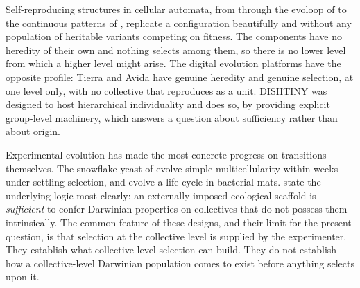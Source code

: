\documentclass{artificial-life}
\begin{document}
Self-reproducing structures in cellular automata, from \citet{langton1984self}
through the evoloop of \citet{sayama1999evoloop} to the continuous patterns of
\citet{chan2020lenia}, replicate a configuration beautifully and without any
population of heritable variants competing on fitness. The components have no
heredity of their own and nothing selects among them, so there is no lower level
from which a higher level might arise. The digital evolution platforms have the
opposite profile: Tierra \citep{ray1991approach} and Avida
\citep{ofria2004avida} have genuine heredity and genuine selection, at one level
only, with no collective that reproduces as a unit. DISHTINY
\citep{moreno2019dishtiny} was designed to host hierarchical individuality and
does so, by providing explicit group-level machinery, which answers a question
about sufficiency rather than about origin.

Experimental evolution has made the most concrete progress on transitions
themselves. The snowflake yeast of \citet{ratcliff2012experimental} evolve
simple multicellularity within weeks under settling selection, and
\citet{hammerschmidt2014life} evolve a life cycle in bacterial mats.
\citet{black2020scaffolding} state the underlying logic most clearly: an
externally imposed ecological scaffold is \emph{sufficient} to confer Darwinian
properties on collectives that do not possess them intrinsically. The common
feature of these designs, and their limit for the present question, is that
selection at the collective level is supplied by the experimenter. They
establish what collective-level selection can build. They do not establish how a
collective-level Darwinian population comes to exist before anything selects
upon it.
\end{document}
